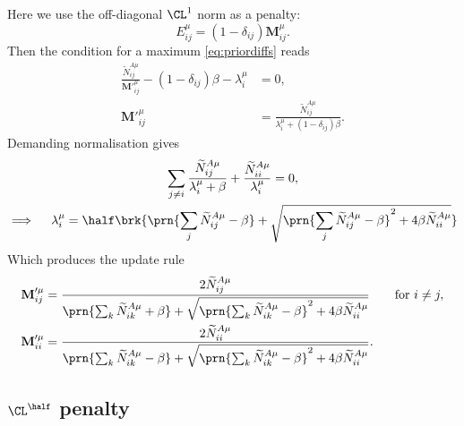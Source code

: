 \documentclass[12pt]{article}
\newcommand{\M}{\mathbf{M}}
\begin{document}
Here we use the off-diagonal $\CL^1$ norm as a penalty:
%
\begin{equation}\label{eq:L1penalty}
  E^\mu_{ij} = (1-\delta_{ij}) \M^\mu_{ij}.
\end{equation}
%
Then the condition for a maximum \eqref{eq:priordiffs} reads
%
\begin{equation}\label{eq:L1priormax}
\begin{aligned}
  \frac{ \widetilde{N}^{A\mu}_{ij} }{ \M'^\mu_{ij} }  - (1-\delta_{ij})\beta - \lambda^\mu_{i} &= 0, \\
   \M'^\mu_{ij} &= \frac{\widetilde{N}^{A\mu}_{ij}}{\lambda^\mu_{i}+(1-\delta_{ij})\beta}.
\end{aligned}
\end{equation}
%
Demanding normalisation gives
%
\begin{multline}\label{eq:L1norm}
  \sum_{j \neq i}\frac{\widetilde{N}^{A\mu}_{ij}}{\lambda^\mu_{i}+\beta} +\frac{\widetilde{N}^{A\mu}_{ii}}{\lambda^\mu_{i}} =0, \\
  \implies \quad
  \lambda^\mu_{i} = \half \brk{ \prn{\sum_j \widetilde{N}^{A\mu}_{ij} -\beta} + 
     \sqrt{\prn{\sum_j \widetilde{N}^{A\mu}_{ij} -\beta}^2 +4\beta\widetilde{N}^{A\mu}_{ii}}}
\end{multline}
%
Which produces the update rule
%
\begin{equation}\label{eq:L1update}
\begin{aligned}
  \M'^\mu_{ij} &= \frac{ 2\widetilde{N}^{A\mu}_{ij} }{ \prn{\sum_k \widetilde{N}^{A\mu}_{ik} +\beta} +
     \sqrt{\prn{\sum_k \widetilde{N}^{A\mu}_{ik} -\beta}^2 +4\beta\widetilde{N}^{A\mu}_{ii}} } 
     \qquad \text{for } i\neq j, \\
  \M'^\mu_{ii} &= \frac{ 2\widetilde{N}^{A\mu}_{ii} }{ \prn{\sum_k \widetilde{N}^{A\mu}_{ik} -\beta} +
     \sqrt{\prn{\sum_k \widetilde{N}^{A\mu}_{ik} -\beta}^2 +4\beta\widetilde{N}^{A\mu}_{ii}} }.
\end{aligned}
\end{equation}
%


\subsection{$\CL^\half$ penalty \label{sec:Lhalf}}
\end{document}
